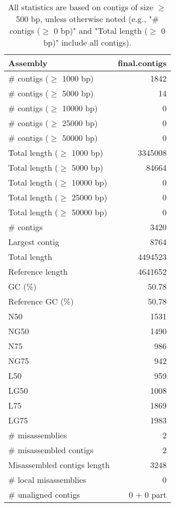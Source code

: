\documentclass[12pt,a4paper]{article}
\begin{document}
\begin{table}[ht]
\begin{center}
\caption{All statistics are based on contigs of size $\geq$ 500 bp, unless otherwise noted (e.g., "\# contigs ($\geq$ 0 bp)" and "Total length ($\geq$ 0 bp)" include all contigs).}
\begin{tabular}{|l*{1}{|r}|}
\hline
Assembly & final.contigs \\ \hline
\# contigs ($\geq$ 1000 bp) & 1842 \\ \hline
\# contigs ($\geq$ 5000 bp) & 14 \\ \hline
\# contigs ($\geq$ 10000 bp) & 0 \\ \hline
\# contigs ($\geq$ 25000 bp) & 0 \\ \hline
\# contigs ($\geq$ 50000 bp) & 0 \\ \hline
Total length ($\geq$ 1000 bp) & 3345008 \\ \hline
Total length ($\geq$ 5000 bp) & 84664 \\ \hline
Total length ($\geq$ 10000 bp) & 0 \\ \hline
Total length ($\geq$ 25000 bp) & 0 \\ \hline
Total length ($\geq$ 50000 bp) & 0 \\ \hline
\# contigs & 3420 \\ \hline
Largest contig & 8764 \\ \hline
Total length & 4494523 \\ \hline
Reference length & 4641652 \\ \hline
GC (\%) & 50.78 \\ \hline
Reference GC (\%) & 50.78 \\ \hline
N50 & 1531 \\ \hline
NG50 & 1490 \\ \hline
N75 & 986 \\ \hline
NG75 & 942 \\ \hline
L50 & 959 \\ \hline
LG50 & 1008 \\ \hline
L75 & 1869 \\ \hline
LG75 & 1983 \\ \hline
\# misassemblies & 2 \\ \hline
\# misassembled contigs & 2 \\ \hline
Misassembled contigs length & 3248 \\ \hline
\# local misassemblies & 0 \\ \hline
\# unaligned contigs & 0 + 0 part \\ \hline

\end{tabular}
\end{center}
\end{table}
\end{document}
